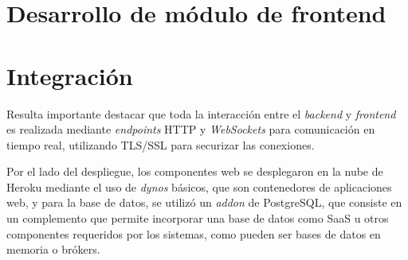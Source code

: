 \section{Desarrollo de módulo de frontend}

\section{Integración}

Resulta importante destacar que toda la interacción entre el \textit{backend} y \textit{frontend} es realizada mediante \textit{endpoints} HTTP y \textit{WebSockets} para comunicación en tiempo real, utilizando TLS/SSL para securizar las conexiones. 

Por el lado del despliegue, los componentes web se desplegaron en la nube de Heroku mediante el uso de \textit{dynos} básicos, que son contenedores de aplicaciones web\citep{HEROKU:1}, y para la base de datos, se utilizó un \textit{addon} de PostgreSQL, que consiste en un complemento que permite incorporar una base de datos como SaaS u otros componentes requeridos por los sistemas, como pueden ser bases de datos en memoria o brókers\citep{HEROKU:2}.

